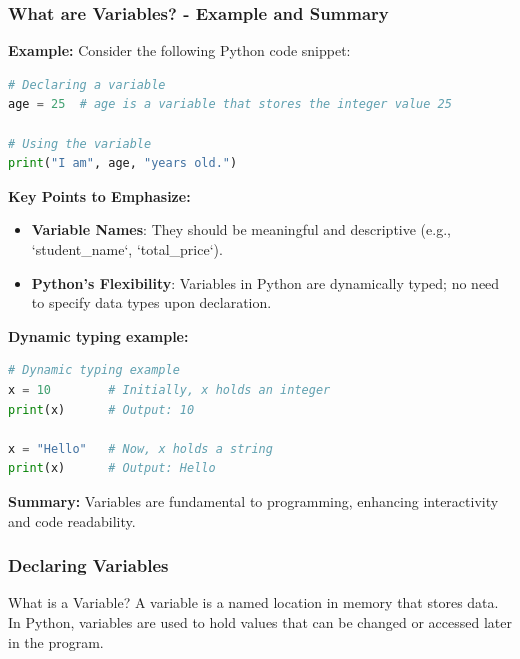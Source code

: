 \documentclass{beamer}
\begin{document}
\begin{frame}[fragile]
    \frametitle{What are Variables? - Example and Summary}
    \textbf{Example:} Consider the following Python code snippet:
    
    \begin{lstlisting}[language=Python]
# Declaring a variable
age = 25  # age is a variable that stores the integer value 25

# Using the variable
print("I am", age, "years old.")
    \end{lstlisting}
    
    \textbf{Key Points to Emphasize:}
    \begin{itemize}
        \item \textbf{Variable Names}: They should be meaningful and descriptive (e.g., `student_name`, `total_price`).
        \item \textbf{Python's Flexibility}: Variables in Python are dynamically typed; no need to specify data types upon declaration.
    \end{itemize}
    
    \textbf{Dynamic typing example:}
    \begin{lstlisting}[language=Python]
# Dynamic typing example
x = 10        # Initially, x holds an integer
print(x)      # Output: 10

x = "Hello"   # Now, x holds a string
print(x)      # Output: Hello
    \end{lstlisting}
    
    \textbf{Summary:} Variables are fundamental to programming, enhancing interactivity and code readability.
\end{frame}

\begin{frame}[fragile]
    \frametitle{Declaring Variables}
    \begin{block}{What is a Variable?}
        A variable is a named location in memory that stores data. 
        In Python, variables are used to hold values that can be changed or accessed later in the program.
    \end{block}
\end{frame}
\end{document}
